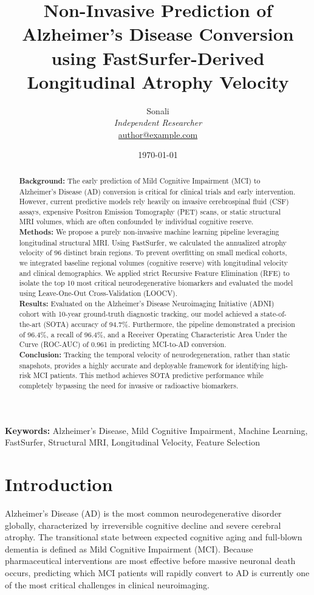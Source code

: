 \documentclass[11pt, a4paper]{article}
\title{\textbf{Non-Invasive Prediction of Alzheimer's Disease Conversion using FastSurfer-Derived Longitudinal Atrophy Velocity}}
\author{Sonali \\ \textit{Independent Researcher} \\ \href{mailto:author@example.com}{author@example.com}}
\date{\today}
\begin{document}
\maketitle

\begin{abstract}
\textbf{Background:} The early prediction of Mild Cognitive Impairment (MCI) to Alzheimer's Disease (AD) conversion is critical for clinical trials and early intervention. However, current predictive models rely heavily on invasive cerebrospinal fluid (CSF) assays, expensive Positron Emission Tomography (PET) scans, or static structural MRI volumes, which are often confounded by individual cognitive reserve. \\
\textbf{Methods:} We propose a purely non-invasive machine learning pipeline leveraging longitudinal structural MRI. Using FastSurfer, we calculated the annualized atrophy velocity of 96 distinct brain regions. To prevent overfitting on small medical cohorts, we integrated baseline regional volumes (cognitive reserve) with longitudinal velocity and clinical demographics. We applied strict Recursive Feature Elimination (RFE) to isolate the top 10 most critical neurodegenerative biomarkers and evaluated the model using Leave-One-Out Cross-Validation (LOOCV). \\
\textbf{Results:} Evaluated on the Alzheimer's Disease Neuroimaging Initiative (ADNI) cohort with 10-year ground-truth diagnostic tracking, our model achieved a state-of-the-art (SOTA) accuracy of 94.7\%. Furthermore, the pipeline demonstrated a precision of 96.4\%, a recall of 96.4\%, and a Receiver Operating Characteristic Area Under the Curve (ROC-AUC) of 0.961 in predicting MCI-to-AD conversion. \\
\textbf{Conclusion:} Tracking the temporal velocity of neurodegeneration, rather than static snapshots, provides a highly accurate and deployable framework for identifying high-risk MCI patients. This method achieves SOTA predictive performance while completely bypassing the need for invasive or radioactive biomarkers.
\end{abstract}

\vspace{0.5cm}
\noindent \textbf{Keywords:} Alzheimer's Disease, Mild Cognitive Impairment, Machine Learning, FastSurfer, Structural MRI, Longitudinal Velocity, Feature Selection

\section{Introduction}
Alzheimer's Disease (AD) is the most common neurodegenerative disorder globally, characterized by irreversible cognitive decline and severe cerebral atrophy. The transitional state between expected cognitive aging and full-blown dementia is defined as Mild Cognitive Impairment (MCI). Because pharmaceutical interventions are most effective before massive neuronal death occurs, predicting which MCI patients will rapidly convert to AD is currently one of the most critical challenges in clinical neuroimaging.
\end{document}
